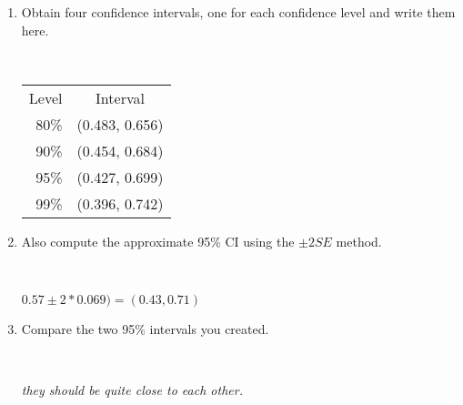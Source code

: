 \begin{enumerate}
\begin{enumerate}
\item Obtain four confidence intervals, one for each confidence
      level and write them here.
\begin{students}
 \ \   \vspace*{1cm}\\
\end{students}
\begin{key}
  \begin{tabular}{|r|c|}
    \hline
  Level & Interval \\
  80\%& (0.483, 0.656) \\
  90\% & (0.454, 0.684) \\
  95\% &(0.427, 0.699) \\
  99\% & (0.396, 0.742)
  \end{tabular}
\end{key}

\item Also compute the approximate 95\% CI using the $\pm 2 SE$ method.
   
\begin{students}
 \ \   \vspace*{1cm}\\
\end{students}
\begin{key}
   $ 0.57 \pm 2 * 0.069) =  (0.43, 0.71) $  
\end{key}
\item Compare the two 95\% intervals you created.
\begin{students}
 \ \   \vspace*{2cm}\\
\end{students}
\begin{key}
   {\it they should be quite close to each other.}\\
\end{key}


\end{enumerate}
\end{enumerate}
